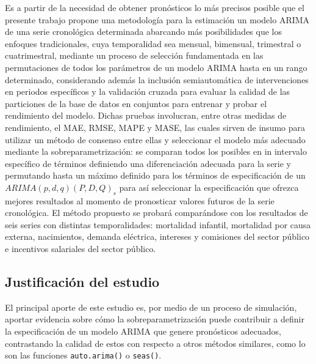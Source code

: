 \documentclass[
]{article}
\begin{document}
Es a partir de la necesidad de obtener pronósticos lo más precisos
posible que el presente trabajo propone una metodología para la
estimación un modelo ARIMA de una serie cronológica determinada
abarcando más posibilidades que los enfoques tradicionales, cuya
temporalidad sea mensual, bimensual, trimestral o cuatrimestral,
mediante un proceso de selección fundamentada en las permutaciones de
todos los parámetros de un modelo ARIMA hasta en un rango determinado,
considerando además la inclusión semiautomática de intervenciones en
periodos específicos y la validación cruzada para evaluar la calidad de
las particiones de la base de datos en conjuntos para entrenar y probar
el rendimiento del modelo. Dichas pruebas involucran, entre otras
medidas de rendimiento, el MAE, RMSE, MAPE y MASE, las cuales sirven de
insumo para utilizar un método de consenso entre ellas y seleccionar el
modelo más adecuado mediante la sobreparametrización: se comparan todos
los posibles en in intervalo específico de términos definiendo una
diferenciación adecuada para la serie y permutando hasta un máximo
definido para los términos de especificación de un
\(ARIMA(p, d, q)(P, D, Q)_s\) para así seleccionar la especificación que
ofrezca mejores resultados al momento de pronosticar valores futuros de
la serie cronológica. El método propuesto se probará comparándose con
los resultados de seis series con distintas temporalidades: mortalidad
infantil, mortalidad por causa externa, nacimientos, demanda eléctrica,
intereses y comisiones del sector público e incentivos salariales del
sector público.

\subsection{Justificación del estudio}

El principal aporte de este estudio es, por medio de un proceso de
simulación, aportar evidencia sobre cómo la sobreparametrización puede
contribuir a definir la especificación de un modelo ARIMA que genere
pronósticos adecuados, contrastando la calidad de estos con respecto a
otros métodos similares, como lo son las funciones \texttt{auto.arima()}
o \texttt{seas()}.
\end{document}

